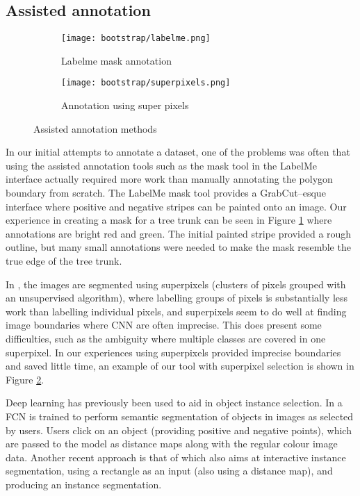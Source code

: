 \subsection {Assisted annotation}


\begin{figure}[ht]
\centering
\begin{subfigure}{.25\textwidth}
  \centering
  \texttt{[image: bootstrap/labelme.png]}
  \caption{Labelme mask annotation}  
  \label{fig:bootstrap_labelme}
\end{subfigure}%
\begin{subfigure}{.25\textwidth}
  \centering
  \texttt{[image: bootstrap/superpixels.png]}
  \caption{Annotation using super pixels}
  \label{fig:bootstrap_superpixels}
\end{subfigure}

\caption{Assisted annotation methods}
\label{fig:bootstrap_annot_method}
\end{figure}


In our initial attempts to annotate a dataset, one of the problems was often that using the assisted annotation tools such as the mask tool in the LabelMe \cite{Russell2007} interface actually required more work than manually annotating the polygon boundary from scratch. The LabelMe mask tool provides a GrabCut--esque interface where positive and negative stripes can be painted onto an image. Our experience in creating a mask for a tree trunk can be seen in Figure \ref{fig:bootstrap_labelme} where annotations are bright red and green. The initial painted stripe provided a rough outline, but many small annotations were needed to make the mask resemble the true edge of the tree trunk.

In \cite{Galloway2017}, the images are segmented using superpixels (clusters of pixels grouped with an unsupervised algorithm), where labelling groups of pixels is substantially less work than labelling individual pixels, and superpixels seem to do well at finding image boundaries where \gls{CNN} are often imprecise. This does present some difficulties, such as the ambiguity where multiple classes are covered in one superpixel. In our experiences using superpixels provided imprecise boundaries and saved little time, an example of our tool with superpixel selection is shown in Figure \ref{fig:bootstrap_superpixels}.

Deep learning has previously been used to aid in object instance selection. In \cite{Xu2016} a \gls{FCN} is trained to perform semantic segmentation of objects in images as selected by users. Users click on an object (providing positive and negative points), which are passed to the model as distance maps along with the regular colour image data. Another recent approach is that of \cite{Xu2017} which also aims at interactive instance segmentation, using a rectangle as an input (also using a distance map), and producing an instance segmentation.

